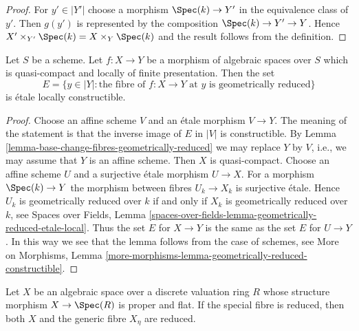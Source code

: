\begin{proof}
For $y' \in |Y'|$ choose a morphism $\Spec(k) \to Y'$
in the equivalence class of $y'$. Then $g(y')$ is
represented by the composition $\Spec(k) \to Y' \to Y$.
Hence $X' \times_{Y'} \Spec(k) = X \times_Y \Spec(k)$
and the result follows from the definition.
\end{proof}

\begin{lemma}
\label{lemma-geometrically-reduced-constructible}
Let $S$ be a scheme. Let $f : X \to Y$ be a morphism of algebraic spaces
over $S$ which is quasi-compact and
locally of finite presentation. Then the set
$$
E = \{y \in |Y| : \text{the fibre of }f : X \to Y\text{ at }y
\text{ is geometrically reduced}\}
$$
is \'etale locally constructible.
\end{lemma}

\begin{proof}
Choose an affine scheme $V$ and an \'etale morphism $V  \to Y$.
The meaning of the statement is that the inverse image of $E$
in $|V|$ is constructible. By
Lemma \ref{lemma-base-change-fibres-geometrically-reduced}
we may replace $Y$ by $V$, i.e., we may assume that $Y$
is an affine scheme. Then $X$ is quasi-compact. Choose an
affine scheme $U$ and a surjective \'etale morphism $U \to X$.
For a morphism $\Spec(k) \to Y$ the morphism between fibres
$U_k \to X_k$ is surjective \'etale. Hence $U_k$ is geometrically
reduced over $k$ if and only if $X_k$ is geometrically reduced
over $k$, see Spaces over Fields, Lemma
\ref{spaces-over-fields-lemma-geometrically-reduced-etale-local}.
Thus the set $E$ for $X \to Y$ is the same as the set $E$
for $U \to Y$.
In this way we see that the lemma follows from the case
of schemes, see More on Morphisms, Lemma
\ref{more-morphisms-lemma-geometrically-reduced-constructible}.
\end{proof}

\begin{lemma}
\label{lemma-proper-flat-over-dvr-reduced-fibre}
Let $X$ be an algebraic space over a discrete valuation ring $R$
whose structure morphism $X \to \Spec(R)$ is proper and flat.
If the special fibre is reduced, then
both $X$ and the generic fibre $X_\eta$ are reduced.
\end{lemma}

